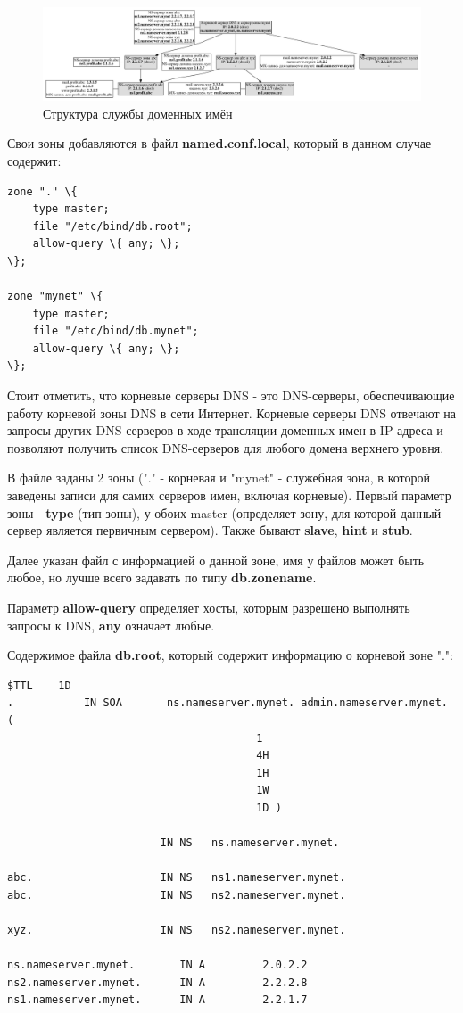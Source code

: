 \documentclass[a4paper,12pt]{article}
\begin{document}
\begin{figure}
\centering
\includegraphics[width=\textwidth]{includes/dns_gv.pdf}
\caption{Структура службы доменных имён}
\label{fig:dns}
\end{figure}

Свои зоны добавляются в файл \textbf{named.conf.local}, который в данном случае содержит:
\begin{verbatim}
zone "." \{
    type master;
    file "/etc/bind/db.root";
    allow-query \{ any; \};
\};

zone "mynet" \{
    type master;
    file "/etc/bind/db.mynet";
    allow-query \{ any; \};
\};
\end{verbatim}

Стоит отметить, что корневые серверы DNS - это DNS-серверы, обеспечивающие работу корневой зоны DNS в сети Интернет. Корневые серверы DNS отвечают на запросы других DNS-серверов в ходе трансляции доменных имен в IP-адреса и позволяют получить список DNS-серверов для любого домена верхнего уровня.

В файле заданы 2 зоны ("." - корневая и "mynet" - служебная зона, в которой заведены записи для самих серверов имен, включая корневые). Первый параметр зоны - \textbf{type} (тип зоны), у обоих master (определяет зону, для которой данный сервер является первичным сервером). Также бывают \textbf{slave}, \textbf{hint} и \textbf{stub}.

Далее указан файл с информацией о данной зоне, имя у файлов может быть любое, но лучше всего задавать по типу \textbf{db.zonename}.

Параметр \textbf{allow-query} определяет хосты, которым разрешено выполнять запросы к DNS, \textbf{any} означает любые.

Содержимое файла \textbf{db.root}, который содержит информацию о корневой зоне ".":
\begin{verbatim}
$TTL    1D
.           IN SOA       ns.nameserver.mynet. admin.nameserver.mynet. (
                                       1
                                       4H
                                       1H
                                       1W
                                       1D )

                        IN NS   ns.nameserver.mynet.

abc.                    IN NS   ns1.nameserver.mynet.
abc.                    IN NS   ns2.nameserver.mynet.

xyz.                    IN NS   ns2.nameserver.mynet.

ns.nameserver.mynet.       IN A         2.0.2.2
ns2.nameserver.mynet.      IN A         2.2.2.8
ns1.nameserver.mynet.      IN A         2.2.1.7
\end{verbatim}
\end{document}
